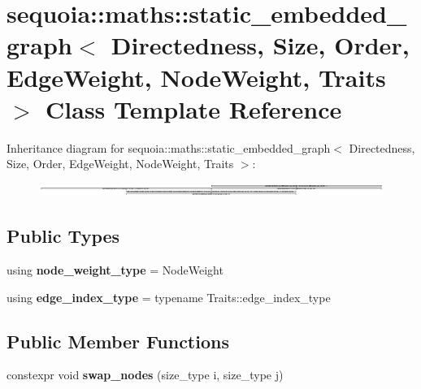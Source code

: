 \hypertarget{classsequoia_1_1maths_1_1static__embedded__graph}{}\section{sequoia\+::maths\+::static\+\_\+embedded\+\_\+graph$<$ Directedness, Size, Order, Edge\+Weight, Node\+Weight, Traits $>$ Class Template Reference}
\label{classsequoia_1_1maths_1_1static__embedded__graph}
Inheritance diagram for sequoia\+::maths\+::static\+\_\+embedded\+\_\+graph$<$ Directedness, Size, Order, Edge\+Weight, Node\+Weight, Traits $>$\+:\begin{figure}[H]
\begin{center}
\leavevmode
\includegraphics[height=0.432599cm]{classsequoia_1_1maths_1_1static__embedded__graph}
\end{center}
\end{figure}
\subsection*{Public Types}
\begin{DoxyCompactItemize}
\item 
\mbox{\label{classsequoia_1_1maths_1_1static__embedded__graph_aadfb9d56422eb67c1e547078b08d9f28}} 
using {\bfseries node\+\_\+weight\+\_\+type} = Node\+Weight
\item 
\mbox{\label{classsequoia_1_1maths_1_1static__embedded__graph_ad9edcee1164137648d3822b93b55cd20}} 
using {\bfseries edge\+\_\+index\+\_\+type} = typename Traits\+::edge\+\_\+index\+\_\+type
\end{DoxyCompactItemize}
\subsection*{Public Member Functions}
\begin{DoxyCompactItemize}
\item 
\mbox{\label{classsequoia_1_1maths_1_1static__embedded__graph_a47bacd2540cedc9108116af317276621}} 
constexpr void {\bfseries swap\+\_\+nodes} (size\+\_\+type i, size\+\_\+type j)
\end{DoxyCompactItemize}
